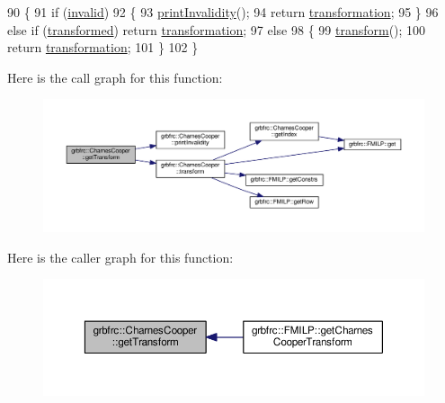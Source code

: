 \begin{DoxyCode}
90  \{
91   \textcolor{keywordflow}{if} (\hyperlink{classgrbfrc_1_1CharnesCooper_a4aaa78ed310e18365a3ec113079b3cd2}{invalid}) 
92    \{
93     \hyperlink{classgrbfrc_1_1CharnesCooper_a7fd7dab1c9c2b07684f632ec760ce254}{printInvalidity}();
94     \textcolor{keywordflow}{return} \hyperlink{classgrbfrc_1_1CharnesCooper_a9107f891576f27501e5f103dca964359}{transformation};
95    \}
96   \textcolor{keywordflow}{else} \textcolor{keywordflow}{if} (\hyperlink{classgrbfrc_1_1CharnesCooper_a9a0d42480205cfd0f380e104ba83f24e}{transformed}) \textcolor{keywordflow}{return} \hyperlink{classgrbfrc_1_1CharnesCooper_a9107f891576f27501e5f103dca964359}{transformation}; 
97   \textcolor{keywordflow}{else} 
98    \{
99     \hyperlink{classgrbfrc_1_1CharnesCooper_a39fc997916d1ea49eb71befd41b00122}{transform}();
100     \textcolor{keywordflow}{return} \hyperlink{classgrbfrc_1_1CharnesCooper_a9107f891576f27501e5f103dca964359}{transformation};
101    \}
102  \}
\end{DoxyCode}


Here is the call graph for this function\+:
\nopagebreak
\begin{figure}[H]
\begin{center}
\leavevmode
\includegraphics[width=350pt]{classgrbfrc_1_1CharnesCooper_aaa36ff99822f4a8e04c01ccc6125230c_cgraph}
\end{center}
\end{figure}




Here is the caller graph for this function\+:
\nopagebreak
\begin{figure}[H]
\begin{center}
\leavevmode
\includegraphics[width=350pt]{classgrbfrc_1_1CharnesCooper_aaa36ff99822f4a8e04c01ccc6125230c_icgraph}
\end{center}
\end{figure}


